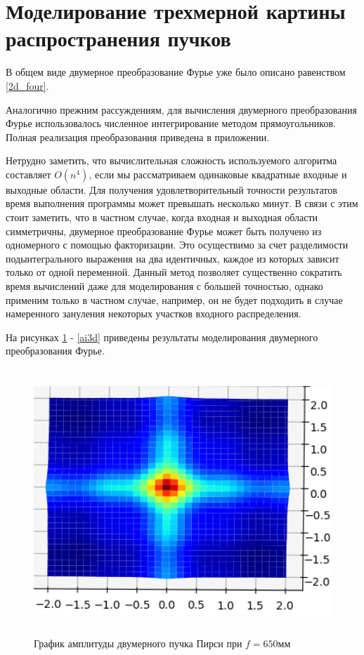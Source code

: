 	\section{Моделирование трехмерной картины распространения пучков}{
	В общем виде двумерное преобразование Фурье уже было описано равенством \eqref{2d_four}.
	
	Аналогично прежним рассуждениям, для вычисления двумерного преобразования Фурье использовалось численное интегрирование методом прямоугольников. Полная реализация преобразования приведена в приложении.
	
	Нетрудно заметить, что вычислительная сложность используемого алгоритма составляет $O(n^4)$, если мы рассматриваем одинаковые квадратные входные и выходные области. Для получения удовлетворительный точности результатов время выполнения программы может превышать несколько минут. В связи с этим стоит заметить, что в частном случае, когда входная и выходная области симметричны, двумерное преобразование Фурье может быть получено из одномерного с помощью факторизации. Это осуществимо за счет разделимости подынтегрального выражения на два идентичных, каждое из которых зависит только от одной переменной. Данный метод позволяет существенно сократить время вычислений даже для моделирования с большей точностью, однако применим только в частном случае, например, он не будет подходить в случае намеренного зануления некоторых участков входного распределения. 
	
	На рисунках \ref{pe3d} - \ref{ai3d} приведены результаты моделирования двумерного преобразования Фурье.
		\begin{figure}[H]
	\centering
\includegraphics[height = 10cm]{plots/pe3d}
\vspace{0.2cm}
\caption{График амплитуды двумерного пучка Пирси при $f = 650$мм}
	\label{pe3d}
\end{figure}

}
